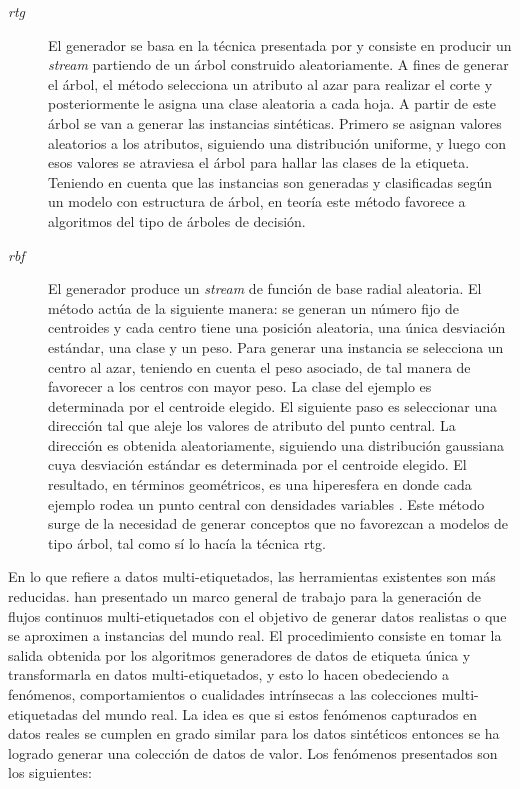\begin{description}

	\item[\textit{\acrfull{rtg}}] El generador se basa en la técnica presentada
	      por \citeauthor{domingos_mining_2002} \cite{domingos_mining_2002} y
	      consiste en producir un \textit{stream} partiendo de un árbol construido
	      aleatoriamente. A fines de generar el árbol, el método selecciona un
	      atributo al azar para realizar el corte y posteriormente le asigna una
	      clase aleatoria a cada hoja. A partir de este árbol se van a generar las
	      instancias sintéticas.  Primero se asignan valores aleatorios a los
	      atributos, siguiendo una distribución uniforme, y luego con esos valores se
	      atraviesa el árbol para hallar las clases de la etiqueta. Teniendo en
	      cuenta que las instancias son generadas y clasificadas según un modelo con
	      estructura de árbol, en teoría este método favorece a algoritmos del tipo
	      de árboles de decisión.

	\item[\textit{\acrfull{rbf}}] El generador produce un \textit{stream} de
	      función de base radial aleatoria. El método actúa de la siguiente manera:
	      se generan un número fijo de centroides y cada centro tiene una posición
	      aleatoria, una única desviación estándar, una clase y un peso. Para
	      generar una instancia se selecciona un centro al azar, teniendo en cuenta
	      el peso asociado, de tal manera de favorecer a los centros con mayor peso.
	      La clase del ejemplo es determinada por el centroide elegido. El siguiente
	      paso es seleccionar una dirección tal que aleje los valores de atributo
	      del punto central. La dirección es obtenida aleatoriamente, siguiendo una
	      distribución gaussiana cuya desviación estándar es determinada por el
	      centroide elegido.  El resultado, en términos geométricos, es una
	      hiperesfera en donde cada ejemplo rodea un punto central con densidades
	      variables \cite{kirkby_improving_2007}. Este método surge de la necesidad
	      de generar conceptos que no favorezcan a modelos de tipo árbol, tal como
	      sí lo hacía la técnica \acrshort{rtg}.

\end{description}

En lo que refiere a datos multi-etiquetados, las herramientas existentes son más
reducidas. \citeauthor{read_generating_2009} han presentado un marco general
de trabajo para la generación de flujos continuos multi-etiquetados
\cite{read_generating_2009} con el objetivo de generar datos realistas o que
se aproximen a instancias del mundo real. El procedimiento consiste en tomar la
salida obtenida por los algoritmos generadores de datos de etiqueta única y
transformarla en datos multi-etiquetados, y esto lo hacen obedeciendo a
fenómenos, comportamientos o cualidades intrínsecas a las colecciones
multi-etiquetadas del mundo real. La idea es que si estos fenómenos capturados
en datos reales se cumplen en grado similar para los datos sintéticos entonces
se ha logrado generar una colección de datos de valor. Los fenómenos presentados
son los siguientes:

